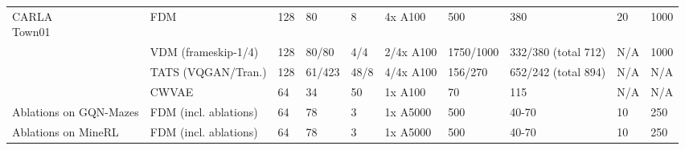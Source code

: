 \begin{table}[h]
\begin{tabular}{p{1.1cm}llp{0.9cm}p{0.6cm}lp{1cm}llp{0.7cm}}
    \midrule
    \multirowcell{4}[0pt][l]{CARLA\\Town01}
                                       &  FDM                       & 128   & 80    & 8     & 4x A100   & 500       & 380   & 20    & 1000      \\
                                       &  VDM (frameskip-1/4)       & 128   & 80/80 & 4/4   & 2/4x A100 & 1750/1000  & 332/380 (total 712)   & N/A  & 1000      \\
                                       &  TATS (VQGAN/Tran.)       & 128    & 61/423    & 48/8   & 4/4x A100   & 156/270    & 652/242 (total 894)     & N/A  & N/A      \\
                                       &  CWVAE                     & 64    & 34    & 50    & 1x A100   & 70      & 115   & N/A   & N/A      \\
   \midrule
    Ablations on GQN-Mazes   &  FDM (incl. ablations)     & 64    & 78    & 3     & 1x A5000  & 500       & 40-70  & 10    & 250      \\
   \midrule
    Ablations on MineRL  &  FDM (incl. ablations)     & 64    & 78    & 3     & 1x A5000  & 500       & 40-70  & 10    & 250      \\
    \bottomrule
  \end{tabular}
\end{table}

